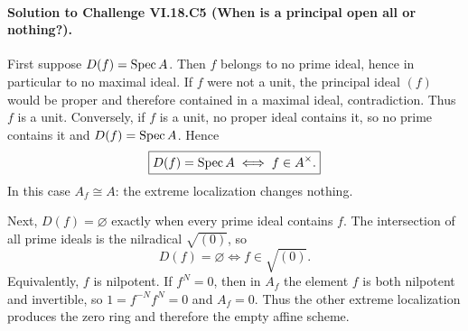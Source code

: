 \paragraph{Solution to Challenge VI.18.C5 (When is a principal open all or nothing?).}
\begin{solution}
First suppose $D(f)=\operatorname{Spec} A$. Then $f$ belongs to no prime ideal, hence in particular to no maximal ideal. If $f$ were not a unit, the principal ideal $(f)$ would be proper and therefore contained in a maximal ideal, contradiction. Thus $f$ is a unit. Conversely, if $f$ is a unit, no proper ideal contains it, so no prime contains it and $D(f)=\operatorname{Spec} A$. Hence
\[
\boxed{D(f)=\operatorname{Spec} A\iff f\in A^\times.}
\]
In this case $A_f\cong A$: the extreme localization changes nothing.

Next, $D(f)=\varnothing$ exactly when every prime ideal contains $f$. The intersection of all prime ideals is the nilradical $\sqrt{(0)}$, so
\[
\boxed{D(f)=\varnothing\iff f\in\sqrt{(0)}.}
\]
Equivalently, $f$ is nilpotent. If $f^N=0$, then in $A_f$ the element $f$ is both nilpotent and invertible, so $1=f^{-N}f^N=0$ and $A_f=0$. Thus the other extreme localization produces the zero ring and therefore the empty affine scheme.
\end{solution}
